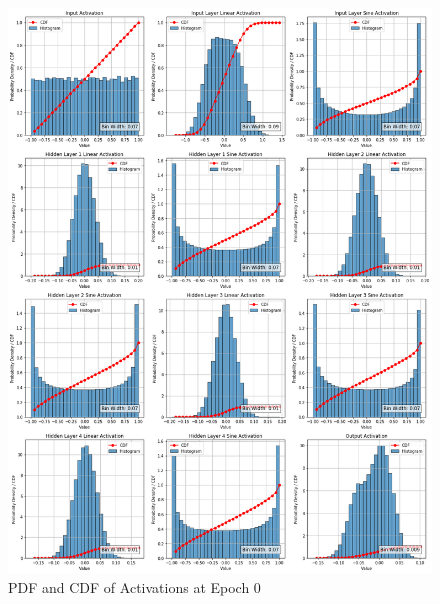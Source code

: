 \documentclass{ioereport}
\begin{document}
    \begin{figure}[H]
        \centering
        \includegraphics[width=\linewidth]{assets/video histogram/epoch0activations.png}
        \caption{PDF and CDF of Activations at Epoch 0}
        \label{fig:video-activation-0}
    \end{figure}
\end{document}
